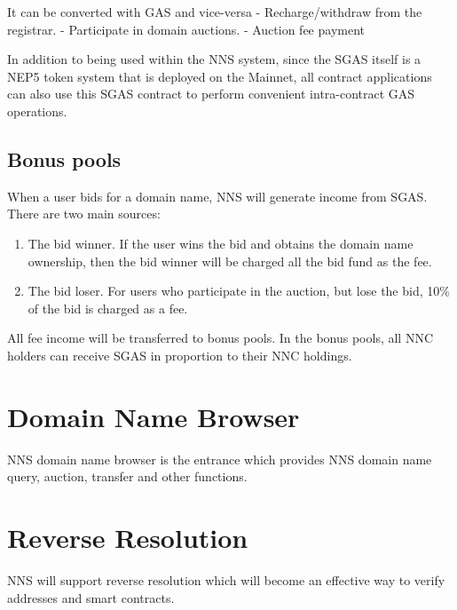 \documentclass[letterpaper,10pt,english]{sphinxmanual}
\begin{document}
It can be converted with GAS and vice-versa
- Recharge/withdraw from the registrar.
- Participate in domain auctions.
- Auction fee payment

In addition to being used within the NNS system, since the SGAS itself is a NEP5 token system that is deployed on the Mainnet, all contract applications can also use this SGAS contract to perform convenient intra-contract GAS operations.


\subsection{Bonus pools}
\label{\detokenize{nns_system:bonus-pools}}
When a user bids for a domain name, NNS will generate income from SGAS. There are two main sources:
\begin{enumerate}
\item {} 
The bid winner. If the user wins the bid and obtains the domain name ownership, then the bid winner will be charged all the bid fund as the fee.

\item {} 
The bid loser. For users who participate in the auction, but lose the bid, 10\% of the bid is charged as a fee.

\end{enumerate}

All fee income will be transferred to bonus pools. In the bonus pools, all NNC holders can receive SGAS in proportion to their NNC holdings.


\section{Domain Name Browser}
\label{\detokenize{nns_system:domain-name-browser}}
NNS domain name browser is the entrance which provides NNS domain name query, auction, transfer and other functions.


\section{Reverse Resolution}
\label{\detokenize{nns_system:reverse-resolution}}
NNS will support reverse resolution which will become an effective way to verify addresses and smart contracts.
\end{document}
